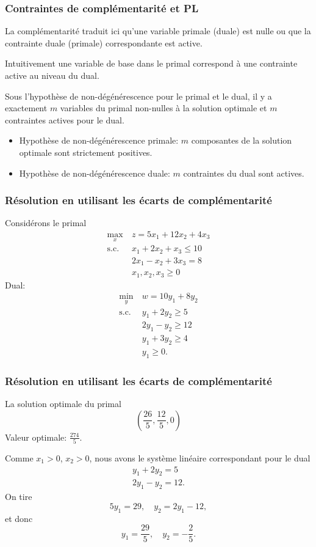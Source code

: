 \documentclass[usepdftitle=false]{beamer}
\begin{document}
\begin{frame}
\frametitle{Contraintes de complémentarité et PL}

La complémentarité traduit ici qu'une variable primale (duale) est nulle ou que la contrainte duale (primale) correspondante est active.

\mbox{}

Intuitivement une variable de base dans le primal correspond à une contrainte active au niveau du dual.

\mbox{}

Sous l'hypothèse de non-dégénérescence pour le primal et le dual, il y a exactement $m$ variables du primal non-nulles à la solution optimale et $m$ contraintes actives pour le dual.
\begin{itemize}
	\item 
Hypothèse de non-dégénérescence primale: $m$ composantes de la solution optimale sont strictement positives.
	\item 
Hypothèse de non-dégénérescence duale: $m$ contraintes du dual sont actives.
\end{itemize}

\end{frame}

\begin{frame}
\frametitle{Résolution en utilisant les écarts de complémentarité}

Considérons le primal
\begin{align*}
\max_x\ & z = 5x_1 +12x_2 +4x_3\\
\mbox{s.c. } & x_1 + 2x_2 + x_3 \leq 10 \\
& 2x_1 - x_2 +3x_3 = 8 \\
& x_1, x_2, x_3 \geq 0
\end{align*}
Dual:
\begin{align*}
\min_y\ & w = 10y_1 + 8y_2 \\
\mbox{s.c. } & y_1 + 2y_2 \geq 5 \\
& 2y_1 - y_2 \geq 12 \\
& y_1 + 3y_2 \geq 4\\
& y_1 \geq 0.
\end{align*}

\end{frame}

\begin{frame}
\frametitle{Résolution en utilisant les écarts de complémentarité}

La solution optimale du primal
\[
\left(
\frac{26}{5}, \frac{12}{5}, 0
\right)
\]
Valeur optimale: $\frac{274}{5}$.

\mbox{}

Comme $x_1 > 0$, $x_2 > 0$, nous avons le système linéaire correspondant pour le dual
\begin{align*}
y_1 + 2y_2 = 5\\
2y_1 - y_2 = 12.
\end{align*}
On tire
\[
5y_1 = 29,\quad y_2 = 2y_1 - 12,
\]
et donc
\[
y_1 = \frac{29}{5},\quad y_2 = -\frac{2}{5}.
\]

\end{frame}
\end{document}
